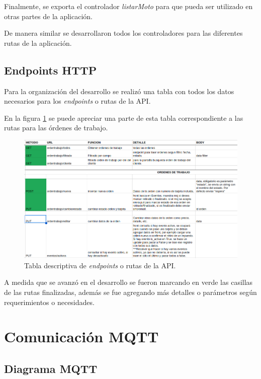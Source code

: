 Finalmente, se exporta el controlador \textit{listarMoto} para que pueda ser utilizado en otras partes de la aplicación.

De manera similar se desarrollaron todos los controladores para las diferentes rutas de la aplicación. 

\subsection{Endpoints HTTP}
\label{subsec:apiendpointshttp}

Para la organización del desarrollo se realizó una tabla con todos los datos necesarios para los \textit{endpoints} o rutas de la API. 

En la figura \ref{fig:apiendpoints} se puede apreciar una parte de esta tabla correspondiente a las rutas para las órdenes de trabajo.

\begin{figure}[ht]
	\centering
	\includegraphics[scale=.40]{./Figures/api-endpoints.png}
	\caption{Tabla descriptiva de \textit{endpoints} o rutas de la API.}
	\label{fig:apiendpoints}
	
\end{figure}

A medida que se avanzó en el desarrollo se fueron marcando en verde las casillas de las rutas finalizadas, además se fue agregando más detalles o parámetros según requerimientos o necesidades.

\section{Comunicación MQTT}
\label{sec:mqttarquitectura}


\subsection{Diagrama MQTT}
\label{subsec:mqttdiagrama}

